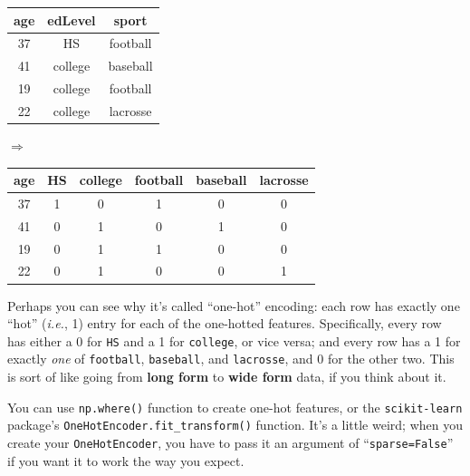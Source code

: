 \begin{center}
\small
{}   %
\begin{tabular}{|c|c|c|}
\hline
age & edLevel & sport \\
\hline
37 & HS & football \\
41 & college & baseball \\
19 & college & football \\
22 & college & lacrosse \\
\hline
\end{tabular}
\quad
{\Huge $\Rightarrow$}\\
\medskip
\quad
{}   %
\begin{tabular}{|c|c|c|c|c|c|}
\hline
age & HS & college & football & baseball & lacrosse \\
\hline
37 & 1 & 0 & 1 & 0 & 0 \\
41 & 0 & 1 & 0 & 1 & 0 \\
19 & 0 & 1 & 1 & 0 & 0 \\
22 & 0 & 1 & 0 & 0 & 1 \\
\hline
\end{tabular}
\end{center}


Perhaps you can see why it's called ``one-hot'' encoding: each row has exactly
one ``hot'' (\textit{i.e.}, 1) entry for each of the one-hotted features.
Specifically, every row has either a 0 for \texttt{HS} and a 1 for
\texttt{college}, or vice versa; and every row has a 1 for exactly \textit{one}
of \texttt{football}, \texttt{baseball}, and \texttt{lacrosse}, and 0 for the
other two. This is sort of like going from \textbf{long form} to \textbf{wide
form} data, if you think about it.



You can use \texttt{np.where()} function to create one-hot features, or the
\texttt{scikit-learn} package's \texttt{OneHotEncoder.fit\_transform()}
function. It's a little weird; when you create your \texttt{OneHotEncoder}, you
have to pass it an argument of ``\texttt{sparse=False}'' if you want it to work
the way you expect.

